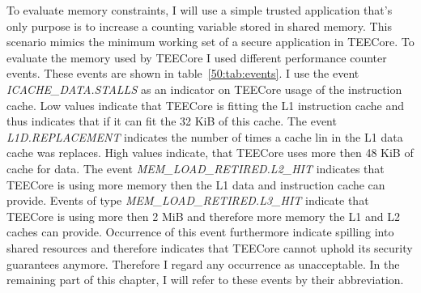 To evaluate memory constraints, I will use a simple trusted application that's
only purpose is to increase a counting variable stored in shared memory. This
scenario mimics the minimum working set of a secure application in TEECore. To
evaluate the memory used by TEECore I used different performance counter events.
These events are shown in table~\ref{50:tab:events}. I use the event
\textit{ICACHE\_DATA.STALLS} as an indicator on TEECore usage of the instruction
cache. Low values indicate that TEECore is fitting the L1 instruction cache and
thus indicates that if it can fit the 32 KiB of this cache. The event
\textit{L1D.REPLACEMENT} indicates the number of times a cache lin in the L1
data cache was replaces. High values indicate, that TEECore uses more then 48
KiB of cache for data. The event \textit{MEM\_LOAD\_RETIRED.L2\_HIT} indicates
that TEECore is using more memory then the L1 data and instruction cache can
provide. Events of type \textit{MEM\_LOAD\_RETIRED.L3\_HIT} indicate that
TEECore is using more then 2 MiB and therefore more memory the L1 and L2 caches
can provide. Occurrence of this event furthermore indicate spilling into shared
resources and therefore indicates that TEECore cannot uphold its security
guarantees anymore. Therefore I regard any occurrence as unacceptable. In the
remaining part of this chapter, I will refer to these events by their
abbreviation.

